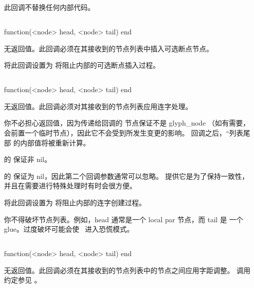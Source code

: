 此回调不替换任何内部代码。

\subsection{}


\begin{typing}
function(<node> head, <node> tail)
end
\end{typing}

无返回值。此回调必须在其接收到的节点列表中插入可选断点节点。

将此回调设置为  将阻止内部的可选断点插入过程。

\subsection{}


\begin{typing}
function(<node> head, <node> tail)
end
\end{typing}

无返回值。此回调必须对其接收到的节点列表应用连字处理。

你不必担心返回值，因为传递给回调的  节点保证不是 glyph_node
（如有需要，会前置一个临时节点），因此它不会受到所发生变更的影响。
回调之后，``列表尾部 的内部值将被重新计算。

 的  保证非 nil。

 的  保证为 nil，因此第二个回调参数通常可以忽略。
提供它是为了保持一致性，并且在需要进行特殊处理时有时会很方便。

将此回调设置为  将阻止内部的连字创建过程。

你不得破坏节点列表。例如，head 通常是一个 local par 节点，而 tail 是
一个 glue。过度破坏可能会使 \LUATEX\ 进入恐慌模式。

\subsection{}


\begin{typing}
function(<node> head, <node> tail)
end
\end{typing}

无返回值。此回调必须在其接收到的节点列表中的节点之间应用字距调整。
调用约定参见 。

